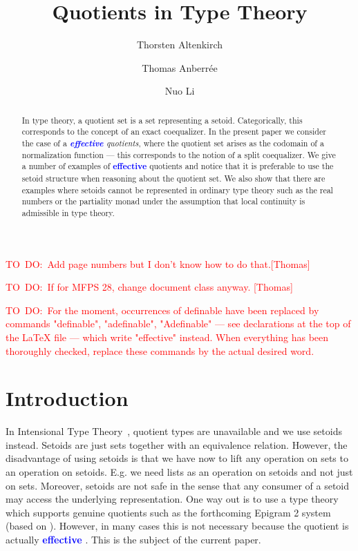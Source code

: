 \documentclass[envcountsame]{llncs}
\title{\Definable Quotients in Type Theory}
\author{Thorsten Altenkirch     \inst{1}
   \and Thomas   Anberr\'{e}e   \inst{2}
   \and Nuo      Li             \inst{2}}
\institute{
School of Computer Science, University of Nottingham, Jubilee Campus, Wollaton Road, Nottingham, NG8 1BB, UK
\and
School of Computer Science, University of Nottingham, Ningbo Campus, 199 Taikang East Road, Ningbo, 315100, China}
\newcommand{\todo}[1]{\textcolor{red}{TO~DO:~#1}}
\newcommand{\amend}[2][]{\textcolor{blue}{#2}}
\newcommand{\definable}{\amend[]{\textbf{effective }}}
\begin{document}
\maketitle

\begin{abstract}
  In type theory, a quotient set is a set representing a setoid.
  Categorically, this corresponds to the concept of an exact
  coequalizer. In the present paper we consider the case of a
  \emph{\definable quotients}, where the quotient set arises as the
  codomain of a normalization function --- this corresponds to the
  notion of a split coequalizer.  We give a number of examples of
  \definable quotients and notice that it is preferable to use the
  setoid structure when reasoning about the quotient set. We also show
  that there are examples where setoids cannot be represented in
  ordinary type theory such as the real numbers or the partiality
  monad under the assumption that local continuity is admissible in
  type theory.
\end{abstract}

\todo{Add page numbers but I don't know how to do that.[Thomas]}

\todo{If for MFPS 28, change document class anyway. [Thomas]}

\todo{For the moment, occurrences of definable have been replaced by commands "definable", "adefinable", "Adefinable" --- see declarations at the top of the {\LaTeX } file --- which write "effective" instead. When everything has been thoroughly checked, replace these commands by the actual desired word.}
\section{Introduction}\label{sec:introduction}

In Intensional Type Theory~\cite{nordstrom1990programming}, quotient
types are unavailable and we use setoids~\cite{barthe2003setoids}
instead. Setoids are just sets together with an equivalence
relation. However, the disadvantage of using setoids is that we have
now to lift any operation on sets to an operation on setoids. E.g. we need lists as
an operation on setoids and not just on sets. Moreover, setoids are
not safe in the sense that any consumer of a setoid may access the
underlying representation. One way out is to use a type theory which
supports genuine quotients such as the forthcoming Epigram 2 system (based on
\cite{alti:ott-conf}).  However, in many cases this is not
necessary because the quotient is actually \definable. This is the
subject of the current paper.
\end{document}
